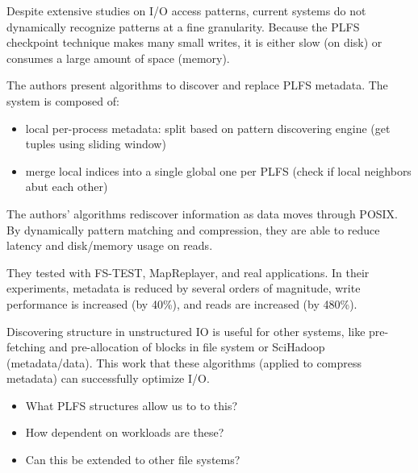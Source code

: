 Despite extensive studies on I/O access patterns, current systems do not
dynamically recognize patterns at a fine granularity. Because the PLFS
checkpoint technique makes many small writes, it is either slow (on disk) or
consumes a large amount of space (memory).  

The authors present algorithms to discover and replace PLFS metadata. The
system is composed of: 

\begin{itemize}

  \item local per-process metadata: split based on pattern discovering engine
  (get tuples using sliding window)

  \item merge local indices into a single global one per PLFS (check if local
  neighbors abut each other)

\end{itemize}

The authors' algorithms rediscover information as data moves through POSIX. By
dynamically  pattern matching and compression, they are able to reduce latency
and disk/memory usage on reads. 

They tested with FS-TEST, MapReplayer, and real applications. In their
experiments, metadata is reduced by several orders of magnitude, write
performance is increased (by 40\%), and reads are increased (by 480\%). 


Discovering structure in unstructured IO is useful for other systems, like
pre-fetching and pre-allocation of blocks in file system or SciHadoop
(metadata/data). This work that these algorithms (applied to compress metadata)
can successfully optimize I/O. 

\begin{itemize}

  \item What PLFS structures allow us to to this?

  \item How dependent on workloads are these?

  \item Can this be extended to other file systems?

\end{itemize}

